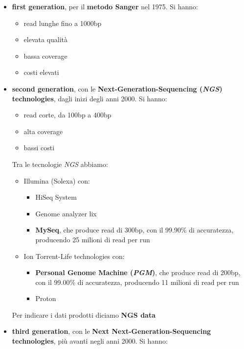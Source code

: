 \documentclass[a4paper,12pt, oneside]{book}
\begin{document}
\begin{itemize}
  \item \textbf{first generation}, per il \textbf{metodo Sanger} nel 1975. Si
  hanno:
  \begin{itemize}
    \item {\color{OliveGreen}read lunghe fino a 1000bp}
    \item {\color{OliveGreen}elevata qualità}
    \item {\color{Maroon}bassa coverage}
    \item {\color{Maroon}costi elevati}
  \end{itemize}
  \item \textbf{second generation}, con le \textbf{Next-Generation-Sequencing
    (\textit{NGS}) technologies}, dagli inizi degli anni 2000. Si
  hanno:
  \begin{itemize}
    \item {\color{Maroon}read corte, da 100bp a 400bp}
    \item {\color{OliveGreen}alta coverage}
    \item {\color{OliveGreen}bassi costi}
  \end{itemize}
  Tra le tecnologie \textit{NGS} abbiamo:
  \begin{itemize}
    \item Illumina (Solexa) con:
    \begin{itemize}
      \item HiSeq System 
      \item Genome analyzer lix
      \item \textbf{MySeq}, che produce read di 300bp, con il 99.90\% di
      accuratezza, producendo 25 milioni di read per run
    \end{itemize}
    \item Ion Torrent-Life technologies con:
    \begin{itemize}
      \item \textbf{Personal Genome Machine (\textit{PGM})}, che produce read di
      200bp, con il 99.00\% di accuratezza, producendo 11 milioni di read per
      run  
      \item Proton 
    \end{itemize}
  \end{itemize}
  Per indicare i dati prodotti diciamo \textbf{NGS data}
  \item \textbf{third generation}, con le \textbf{Next
    Next-Generation-Sequencing technologies}, più avanti negli anni 2000. Si
  hanno:
  \begin{itemize}

\end{itemize}
\end{itemize}
\end{document}
